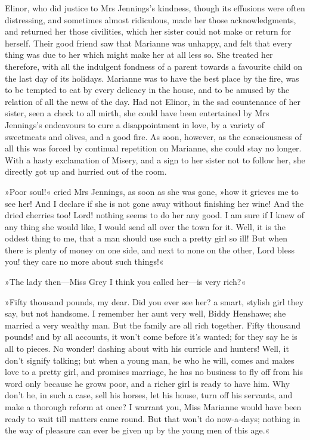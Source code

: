 Elinor, who did justice to Mrs Jennings’s kindness, though its effusions were often distressing, and sometimes almost ridiculous, made her those acknowledgments, and returned her those civilities, which her sister could not make or return for herself. Their good friend saw that Marianne was unhappy, and felt that every thing was due to her which might make her at all less so. She treated her therefore, with all the indulgent fondness of a parent towards a favourite child on the last day of its holidays. Marianne was to have the best place by the fire, was to be tempted to eat by every delicacy in the house, and to be amused by the relation of all the news of the day. Had not Elinor, in the sad countenance of her sister, seen a check to all mirth, she could have been entertained by Mrs Jennings’s endeavours to cure a disappointment in love, by a variety of sweetmeats and olives, and a good fire. As soon, however, as the consciousness of all this was forced by continual repetition on Marianne, she could stay no longer. With a hasty exclamation of Misery, and a sign to her sister not to follow her, she directly got up and hurried out of the room.

»Poor soul!« cried Mrs Jennings, as soon as she was gone, »how it grieves me to see her! And I declare if she is not gone away without finishing her wine! And the dried cherries too! Lord! nothing seems to do her any good. I am sure if I knew of any thing she would like, I would send all over the town for it. Well, it is the oddest thing to me, that a man should use such a pretty girl so ill! But when there is plenty of money on one side, and next to none on the other, Lord bless you! they care no more about such things!\longdash«

»The lady then—Miss Grey I think you called her—is very rich?«

»Fifty thousand pounds, my dear. Did you ever see her? a smart, stylish girl they say, but not handsome. I remember her aunt very well, Biddy Henshawe; she married a very wealthy man. But the family are all rich together. Fifty thousand pounds! and by all accounts, it won’t come before it’s wanted; for they say he is all to pieces. No wonder! dashing about with his curricle and hunters! Well, it don’t signify talking; but when a young man, be who he will, comes and makes love to a pretty girl, and promises marriage, he has no business to fly off from his word only because he grows poor, and a richer girl is ready to have him. Why don’t he, in such a case, sell his horses, let his house, turn off his servants, and make a thorough reform at once? I warrant you, Miss Marianne would have been ready to wait till matters came round. But that won’t do now-a-days; nothing in the way of pleasure can ever be given up by the young men of this age.«

